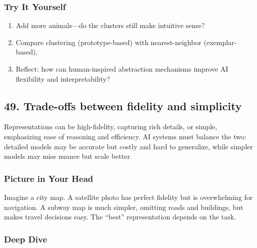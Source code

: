 \documentclass[
  letterpaper,
  DIV=11,
  numbers=noendperiod]{scrreprt}
\providecommand{\tightlist}{%
  \setlength{\itemsep}{0pt}\setlength{\parskip}{0pt}}
\begin{document}
\subsubsection{Try It Yourself}\label{try-it-yourself-47}

\begin{enumerate}
\def\labelenumi{\arabic{enumi}.}
\tightlist
\item
  Add more animals---do the clusters still make intuitive sense?
\item
  Compare clustering (prototype-based) with nearest-neighbor
  (exemplar-based).
\item
  Reflect: how can human-inspired abstraction mechanisms improve AI
  flexibility and interpretability?
\end{enumerate}

\subsection{49. Trade-offs between fidelity and
simplicity}\label{trade-offs-between-fidelity-and-simplicity}

Representations can be high-fidelity, capturing rich details, or simple,
emphasizing ease of reasoning and efficiency. AI systems must balance
the two: detailed models may be accurate but costly and hard to
generalize, while simpler models may miss nuance but scale better.

\subsubsection{Picture in Your Head}\label{picture-in-your-head-48}

Imagine a city map. A satellite photo has perfect fidelity but is
overwhelming for navigation. A subway map is much simpler, omitting
roads and buildings, but makes travel decisions easy. The ``best''
representation depends on the task.

\subsubsection{Deep Dive}\label{deep-dive-48}
\end{document}
